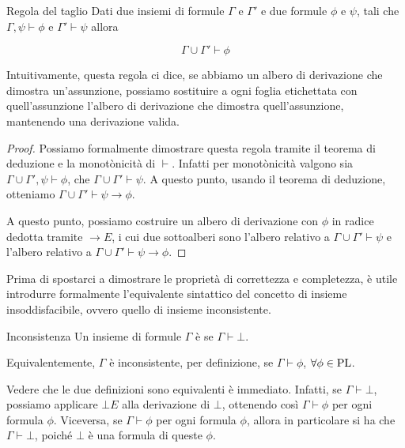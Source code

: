 \begin{theorem}{Regola del taglio}
  Dati due insiemi di formule \(\Gamma\) e \(\Gamma'\) e due formule \(\phi\) e \(\psi\), tali che \(\Gamma, \psi \vdash \phi\) e \(\Gamma' \vdash \psi\) allora
  
  \[\Gamma \cup \Gamma' \vdash \phi\]
\end{theorem}

Intuitivamente, questa regola ci dice, se abbiamo un albero di derivazione che dimostra un'assunzione, possiamo sostituire a ogni foglia etichettata con quell'assunzione l'albero di derivazione che dimostra quell'assunzione, mantenendo una derivazione valida.

\begin{proof}
  Possiamo formalmente dimostrare questa regola tramite il teorema di deduzione e la monotònicità di \(\vdash\).
  Infatti per monotònicità valgono sia \(\Gamma \cup \Gamma', \psi \vdash \phi\), che \(\Gamma \cup \Gamma'\vdash \psi\).
  A questo punto, usando il teorema di deduzione, otteniamo \(\Gamma\cup \Gamma' \vdash \psi \to \phi\).

  A questo punto, possiamo costruire un albero di derivazione con \(\phi\) in radice dedotta tramite \(\to E\), i cui due sottoalberi sono l'albero relativo a \(\Gamma \cup \Gamma' \vdash \psi\) e l'albero relativo a \(\Gamma\cup \Gamma' \vdash \psi \to \phi\).
\end{proof}

Prima di spostarci a dimostrare le proprietà di correttezza e completezza, è utile introdurre formalmente l'equivalente sintattico del concetto di insieme insoddisfacibile, ovvero quello di insieme inconsistente.

\begin{definition}{Inconsistenza}
  Un insieme di formule \(\Gamma\) è  se \(\Gamma \vdash \bot\).

  Equivalentemente, \(\Gamma\) è inconsistente, per definizione, se \(\Gamma \vdash \phi\), \(\forall \phi \in \operatorname{PL}\).
\end{definition}

Vedere che le due definizioni sono equivalenti è immediato.
Infatti, se \(\Gamma \vdash \bot\), possiamo applicare \(\bot E\) alla derivazione di \(\bot\), ottenendo così \(\Gamma \vdash \phi\) per ogni formula \(\phi\). Viceversa, se \(\Gamma \vdash \phi\) per ogni formula \(\phi\), allora in particolare si ha che \(\Gamma \vdash \bot\), poiché \(\bot\) è una formula di queste \(\phi\).

